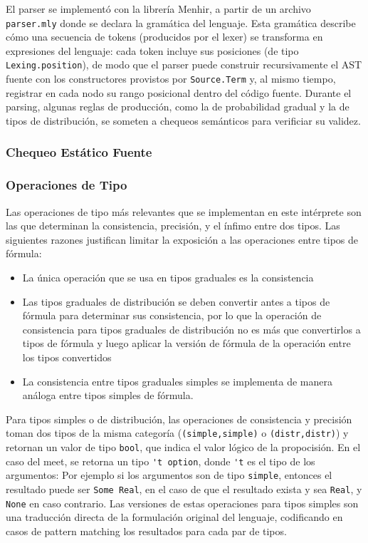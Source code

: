 El parser se implementó con la librería Menhir, a partir de un archivo
\verb|parser.mly| donde se declara la gramática del lenguaje. Esta
gramática describe cómo una secuencia de tokens (producidos por el
lexer) se transforma en expresiones del lenguaje: cada token incluye sus
posiciones (de tipo \verb|Lexing.position|), de modo que el parser puede
construir recursivamente el AST fuente con los constructores provistos
por \verb|Source.Term| y, al mismo tiempo, registrar en cada nodo su
rango posicional dentro del código fuente.  Durante el parsing, algunas
reglas de producción, como la de probabilidad gradual y la de tipos de
distribución, se someten a chequeos semánticos para verificiar su
validez.

\subsubsection{Chequeo Estático Fuente}
\subsubsection{Operaciones de Tipo}

Las operaciones de tipo más relevantes que se implementan en este
intérprete son las que determinan la consistencia, precisión, y el
ínfimo entre dos tipos. Las siguientes razones justifican limitar la
exposición a las operaciones entre tipos de fórmula:
\begin{itemize}
\item La única operación que se usa en tipos graduales es la consistencia
\item Las tipos graduales de distribución se deben convertir antes a tipos de fórmula
  para determinar sus consistencia, por lo que la operación de consistencia para tipos
  graduales de distribución no es más que convertirlos a tipos de fórmula y luego aplicar
  la versión de fórmula de la operación entre los tipos convertidos
\item La consistencia entre tipos graduales simples se implementa de manera análoga
  entre tipos simples de fórmula.
\end{itemize}

Para tipos simples o de distribución, las operaciones de consistencia
y precisión toman dos tipos de la misma categoría
(\verb|(simple,simple)| o \verb|(distr,distr)|) y retornan un valor de
tipo \verb|bool|, que indica el valor lógico de la propocisión. En el
caso del meet, se retorna un tipo \verb|'t option|, donde \verb|'t| es
el tipo de los argumentos: Por ejemplo si los argumentos son de tipo
\verb|simple|, entonces el resultado puede ser \verb|Some Real|, en el
caso de que el resultado exista y sea \verb|Real|, y \verb|None| en
caso contrario.  Las versiones de estas operaciones para tipos
simples son una traducción directa de la formulación original del
lenguaje, codificando en casos de pattern matching los resultados
para cada par de tipos.

